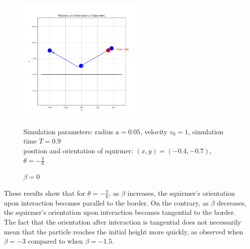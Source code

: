 \documentclass{article}
\begin{document}
\begin{figure}[H]
    \centering
    \includegraphics[width=0.55\textwidth]{graphs/simulations/border/beta0/mpi_6.png}
    \caption{\footnotesize $\beta = 0$}
    Simulation parameters: radius $a=0.05$, velocity $v_0=1$, simulation time $T=0.9$\\
        position and orientation of squirmer: $(x,y)=(-0.4,-0.7)$, $\theta=-\frac{\pi}{6}$
\end{figure}
These results show that for $\theta = -\frac{\pi}{6}$, as $\beta$ increases, the squirmer's orientation upon interaction becomes parallel to the border.
On the contrary, as $\beta$ decreases, the squirmer's orientation upon interaction becomes tangential to the border.\\
The fact that the orientation after interaction is tangential does not necessarily mean that the particle reaches the initial 
height more quickly, as observed when $\beta = -3$ compared to when $\beta = -1.5$.
\end{document}
